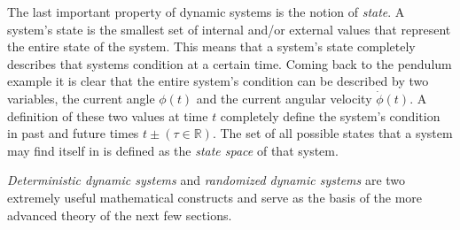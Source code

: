 The last important property of dynamic systems is the notion of \textit{state}. A system's state is the smallest set of internal and/or external values that represent the entire state of the system. This means that a system's state completely describes that systems condition at a certain time. Coming back to the pendulum example it is clear that the entire system's condition can be described by two variables, the current angle $\phi(t)$ and the current angular velocity $\dot{\phi}(t)$. A definition of these two values at time $t$ completely define the system's condition in past and future times $t\pm (\tau \in \mathbb{R})$. The set of all possible states that a system may find itself in is defined as the \textit{state space} of that system.

\textit{Deterministic dynamic systems} and \textit{randomized dynamic systems} are two extremely useful mathematical constructs and serve as the basis of the more advanced theory of the next few sections.



